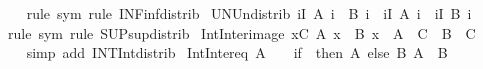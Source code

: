 \begin{isabellebody}
%
\isadelimproof
\ \ %
\endisadelimproof
%
\isatagproof
{}\isamarkupfalse%
\ {\isacharparenleft}{\kern0pt}rule\ sym{\isacharparenright}{\kern0pt}\ {\isacharparenleft}{\kern0pt}rule\ INF{\isacharunderscore}{\kern0pt}inf{\isacharunderscore}{\kern0pt}distrib{\isacharparenright}{\kern0pt}%
\endisatagproof
{\isafoldproof}%
%
\isadelimproof
\isanewline
%
\endisadelimproof
\isanewline
{}\isamarkupfalse%
\ UN{\isacharunderscore}{\kern0pt}Un{\isacharunderscore}{\kern0pt}distrib{\isacharcolon}{\kern0pt}\ {\isachardoublequoteopen}{\isacharparenleft}{\kern0pt}{\isasymUnion}i{\isasymin}I{\isachardot}{\kern0pt}\ A\ i\ {\isasymunion}\ B\ i{\isacharparenright}{\kern0pt}\ {\isacharequal}{\kern0pt}\ {\isacharparenleft}{\kern0pt}{\isasymUnion}i{\isasymin}I{\isachardot}{\kern0pt}\ A\ i{\isacharparenright}{\kern0pt}\ {\isasymunion}\ {\isacharparenleft}{\kern0pt}{\isasymUnion}i{\isasymin}I{\isachardot}{\kern0pt}\ B\ i{\isacharparenright}{\kern0pt}{\isachardoublequoteclose}\isanewline
%
\isadelimproof
\ \ %
\endisadelimproof
%
\isatagproof
{}\isamarkupfalse%
\ {\isacharparenleft}{\kern0pt}rule\ sym{\isacharparenright}{\kern0pt}\ {\isacharparenleft}{\kern0pt}rule\ SUP{\isacharunderscore}{\kern0pt}sup{\isacharunderscore}{\kern0pt}distrib{\isacharparenright}{\kern0pt}%
\endisatagproof
{\isafoldproof}%
%
\isadelimproof
\isanewline
%
\endisadelimproof
\isanewline
{}\isamarkupfalse%
\ Int{\isacharunderscore}{\kern0pt}Inter{\isacharunderscore}{\kern0pt}image{\isacharcolon}{\kern0pt}\ {\isachardoublequoteopen}{\isacharparenleft}{\kern0pt}{\isasymInter}x{\isasymin}C{\isachardot}{\kern0pt}\ A\ x\ {\isasyminter}\ B\ x{\isacharparenright}{\kern0pt}\ {\isacharequal}{\kern0pt}\ {\isasymInter}{\isacharparenleft}{\kern0pt}A\ {\isacharbackquote}{\kern0pt}\ C{\isacharparenright}{\kern0pt}\ {\isasyminter}\ {\isasymInter}{\isacharparenleft}{\kern0pt}B\ {\isacharbackquote}{\kern0pt}\ C{\isacharparenright}{\kern0pt}{\isachardoublequoteclose}\ \ \isanewline
%
\isadelimproof
\ \ %
\endisadelimproof
%
\isatagproof
{}\isamarkupfalse%
\ {\isacharparenleft}{\kern0pt}simp\ add{\isacharcolon}{\kern0pt}\ INT{\isacharunderscore}{\kern0pt}Int{\isacharunderscore}{\kern0pt}distrib{\isacharparenright}{\kern0pt}%
\endisatagproof
{\isafoldproof}%
%
\isadelimproof
%
\endisadelimproof
\isanewline
\isanewline
{}\isamarkupfalse%
\ Int{\isacharunderscore}{\kern0pt}Inter{\isacharunderscore}{\kern0pt}eq{\isacharcolon}{\kern0pt}\ {\isachardoublequoteopen}A\ {\isasyminter}\ {\isasymInter}{\isasymB}\ {\isacharequal}{\kern0pt}\ {\isacharparenleft}{\kern0pt}if\ {\isasymB}{\isacharequal}{\kern0pt}{\isacharbraceleft}{\kern0pt}{\isacharbraceright}{\kern0pt}\ then\ A\ else\ {\isacharparenleft}{\kern0pt}{\isasymInter}B{\isasymin}{\isasymB}{\isachardot}{\kern0pt}\ A\ {\isasyminter}\ B{\isacharparenright}{\kern0pt}{\isacharparenright}{\kern0pt}{\isachardoublequoteclose}\isanewline

\end{isabellebody}
